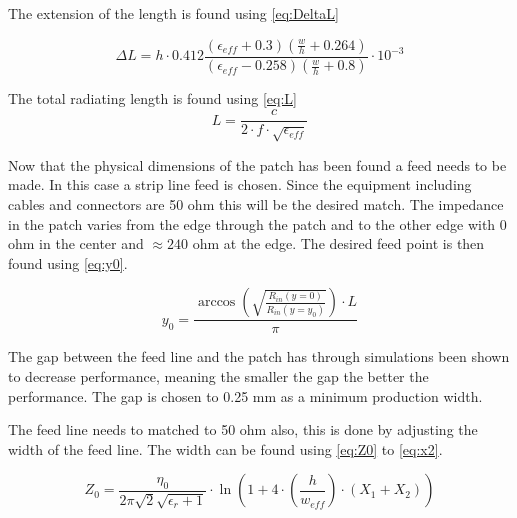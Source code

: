 The extension of the length is found using \autoref{eq:DeltaL}

\begin{equation}\label{eq:DeltaL}
\Delta L = h\cdot0.412 \frac{(\epsilon_{eff}+0.3)\left(\frac{w}{h}+0.264\right)}{(\epsilon_{eff}-0.258)\left(\frac{w}{h}+0.8\right)}\cdot 10^{-3}
\end{equation}

The total radiating length is found using \autoref{eq:L}
\begin{equation}\label{eq:L}
L = \frac{c}{2\cdot f\cdot\sqrt{\epsilon_{eff}}}
\end{equation}

Now that the physical dimensions of the patch has been found a feed needs to be made. In this case a strip line feed is chosen. Since the equipment including cables and connectors are 50 ohm this will be the desired match. The impedance in the patch varies from the edge through the patch and to the other edge with 0 ohm in the center and $\approx 240$ ohm at the edge. The desired feed point is then found using \autoref{eq:y0}. 

\begin{equation}\label{eq:y0}
y_0 = \frac{\arccos\left(\sqrt{\frac{R_{in}(y=0)}{R_{in}(y=y_0)}}\right)\cdot L}{\pi}
\end{equation}
\begin{where}
\end{where}

The gap between the feed line and the patch has through simulations been shown to decrease performance, meaning the smaller the gap the better the performance. The gap is chosen to 0.25 mm as a minimum production width. 

The feed line needs to matched to 50 ohm also, this is done by adjusting the width of the feed line. The width can be found using \autoref{eq:Z0} to \autoref{eq:x2}.

\begin{equation}\label{eq:Z0}
Z_0=\frac{\eta_0}{2\pi\sqrt{2}\sqrt{\epsilon_r+1}}\cdot \ln\left(1+4\cdot \left(\frac{h}{w_{eff}}\right)\cdot (X_1+X_2)\right)
\end{equation}
\begin{where}
\end{where}



